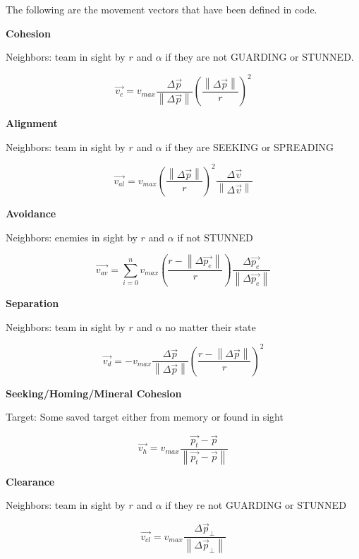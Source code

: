 \documentclass{article}
\begin{document}
The following are the movement vectors that have been defined in code.

\textbf{Cohesion}

Neighbors: team in sight by $r$ and $\alpha$ if they are not GUARDING or STUNNED.

\[ \vec { v_{ c } } =v_{ max }\frac { \Delta  \vec { p }  }{ \left\|   \Delta \vec { p }  \right\|  } \left( \frac { \left\|  \Delta \vec {  p }  \right\|  }{ r }  \right) ^{ 2 } \]

\textbf{Alignment}

Neighbors: team in sight by $r$ and $\alpha$ if they are SEEKING or SPREADING 

\[ \vec { v_{ al } } =v_{ max }{\left( \frac { \left\| \Delta \vec { p } \right\|  }{ r }  \right)}^2\frac {\Delta \vec{v}} { \left\| \Delta \vec{v} \right\| } \]

\textbf{Avoidance}

Neighbors: enemies in sight by $r$ and $\alpha$ if not STUNNED

\[ \vec { v_{ av } } =\sum _{i=0}^{n} {v_{ max } \left( \frac{r - \left\| \Delta \vec{p_e} \right\|} {r} \right) \frac { \Delta \vec { p_e }  }{ \left\| \Delta \vec { p_e }  \right\|  }}  \]

\textbf{Separation}

Neighbors: team in sight by $r$ and $\alpha$ no matter their state

\[ \vec { v_{ d } } =-v_{ max }\frac {\Delta \vec{p}} { \left\| \Delta \vec{p} \right\| }{\left( \frac { r - \left\| \Delta \vec { p } \right\|  }{ r }  \right)}^2 \]

\textbf{Seeking/Homing/Mineral Cohesion}

Target: Some saved target either from memory or found in sight

\[ \vec{v_h} = v_{max} \frac {\vec{p_t} - \vec p} { \left\| \vec{p_t} - \vec p \right\| } \]

\textbf{Clearance}

Neighbors: team in sight by $r$ and $\alpha$ if they re not GUARDING or STUNNED

\[ \vec{v_{cl}} = v_{max} \frac {\Delta \vec p_\perp } { \left\| \Delta \vec p_\perp  \right\| }  \]
\end{document}

